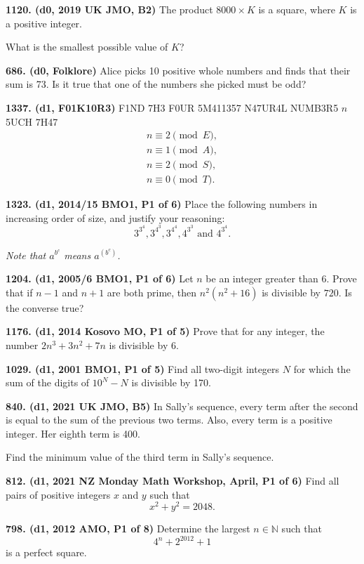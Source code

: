 \documentclass{article}
\begin{document}
\textbf{1120. (\color{red}d0\color{black}, 2019 UK JMO, B2)} The product $8000\times K$ is a square, where $K$ is a positive integer.\vspace{8pt}

What is the smallest possible value of $K$?

\textbf{686. (\color{red}d0\color{black}, Folklore)} Alice picks 10 positive whole numbers and finds that their sum is 73. Is it true that one of the
numbers she picked must be odd?

\textbf{1337. (\color{red}d1\color{black}, F01K10R3)} F1ND 7H3 F0UR 5M411357 N47UR4L NUMB3R5 $n$ 5UCH 7H47 \begin{align*}n \equiv 2 \pmod E,\\n \equiv 1 \pmod A,\\n \equiv 2 \pmod S,\\n \equiv 0 \pmod T.\end{align*}

\textbf{1323. (\color{red}d1\color{black}, 2014/15 BMO1, P1 of 6)} Place the following numbers in increasing order of size, and justify your reasoning: $$3^{3^4},3^{4^3},3^{4^4},4^{3^3}\text{ and }4^{3^4}.$$

\textit{Note that $a^{b^c}$ means $a^{(b^c)}$.}

\textbf{1204. (\color{red}d1\color{black}, 2005/6 BMO1, P1 of 6)} Let $n$ be an integer greater than $6$. Prove that if $n - 1$ and $n + 1$ are both prime, then $n^2(n^2 + 16)$ is divisible by $720$. Is the converse true?

\textbf{1176. (\color{red}d1\color{black}, 2014 Kosovo MO, P1 of 5)} Prove that for any integer, the number $2n^3 + 3n^2 + 7n$ is divisible by 6.

\textbf{1029. (\color{red}d1\color{black}, 2001 BMO1, P1 of 5)} Find all two-digit integers $N$ for which the sum of the digits of $10^N - N$ is divisible by 170.

\textbf{840. (\color{red}d1\color{black}, 2021 UK JMO, B5)} In Sally's sequence, every term after the second is equal to the sum of the previous two terms. Also, every term is a positive integer. Her eighth term is 400.

Find the minimum value of the third term in Sally's sequence.

\textbf{812. (\color{red}d1\color{black}, 2021 NZ Monday Math Workshop, April, P1 of 6)} Find all pairs of positive integers $x$ and $y$ such that
\[x^2 + y^2 = 2048.\]

\textbf{798. (\color{red}d1\color{black}, 2012 AMO, P1 of 8)} Determine the largest $n \in \mathbb{N}$ such that $$ 4^{n}+2^{2012}+1 $$ is a perfect square.
\end{document}
